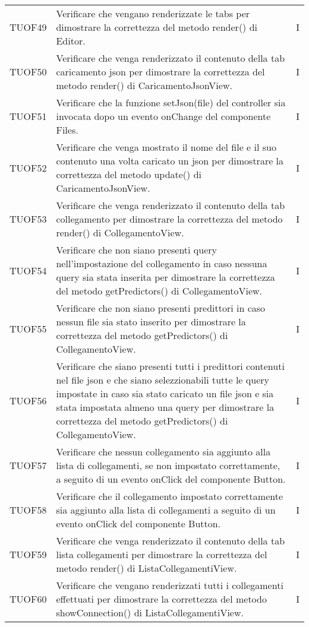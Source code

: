 \begin{longtable}{C{2cm} L{8cm} C{2cm}}

TUOF49 & Verificare che vengano renderizzate le tabs per dimostrare la correttezza del metodo render() di Editor. & I \\
TUOF50 & Verificare che venga renderizzato il contenuto della tab caricamento json per dimostrare la correttezza del metodo render() di CaricamentoJsonView. & I \\
TUOF51 & Verificare che la funzione setJson(file) del controller sia invocata dopo un evento onChange del componente Files. & I \\
TUOF52& Verificare che venga mostrato il nome del file e il suo contenuto una volta caricato un json per dimostrare la correttezza del metodo update() di CaricamentoJsonView. & I \\
TUOF53 & Verificare che venga renderizzato il contenuto della tab collegamento per dimostrare la correttezza del metodo render() di CollegamentoView. & I \\
TUOF54 & Verificare che non siano presenti query nell'impostazione del collegamento in caso nessuna query sia stata inserita per dimostrare la correttezza del metodo getPredictors() di CollegamentoView. & I \\
TUOF55 & Verificare che non siano presenti predittori in caso nessun file sia stato inserito per dimostrare la correttezza del metodo getPredictors() di CollegamentoView. & I \\
TUOF56 & Verificare che siano presenti tutti i predittori contenuti nel file json e che siano selezzionabili tutte le query impostate in caso sia stato caricato un file json e sia stata impostata almeno una query per dimostrare la correttezza del metodo getPredictors() di CollegamentoView. & I \\
TUOF57 & Verificare che nessun collegamento sia aggiunto alla lista di collegamenti, se non impostato correttamente, a seguito di un evento onClick del componente Button. & I \\
TUOF58 & Verificare che il collegamento impostato correttamente sia aggiunto alla lista di collegamenti a seguito di un evento onClick del componente Button. & I \\
TUOF59 & Verificare che venga renderizzato il contenuto della tab lista collegamenti per dimostrare la correttezza del metodo render() di ListaCollegamentiView. & I \\
TUOF60 & Verificare che vengano renderizzati tutti i collegamenti effettuati per dimostrare la correttezza del metodo showConnection() di ListaCollegamentiView. & I \\

\end{longtable}
